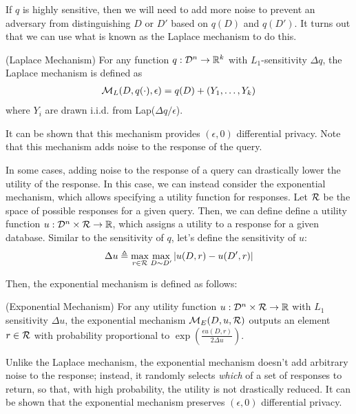 \documentclass{article} %
\begin{document}
If $q$ is highly sensitive, then we will need to add more noise to prevent an
adversary from distinguishing $D$ or $D'$ based on $q(D)$ and $q(D')$. It turns
out that we can use what is known as the Laplace mechanism to do this.

\begin{definition}{(Laplace Mechanism)}
For any function $q : \mathcal{D}^n \rightarrow \mathbb{R}^k$ with $L_1$-sensitivity
$\Delta q$, the Laplace mechanism is defined as
\begin{align*}
\mathcal{M}_L(D, q(\cdot), \epsilon) = q(D) + (Y_1, \dots, Y_k)
\end{align*}
where $Y_i$ are drawn i.i.d. from Lap($\Delta q / \epsilon$).
\label{def:laplace_mechanism}
\end{definition}

It can be shown that this mechanism provides $(\epsilon, 0)$ differential
privacy. Note that this mechanism adds noise to the response of the query.

In some cases, adding noise to the response of a query can drastically lower
the utility of the response. In this case, we can instead consider the
exponential mechanism, which allows specifying a utility function for responses.
Let $\mathcal{R}$ be the space of possible responses for a given query. Then, we can
define define a utility function $u : \mathcal{D}^n \times \mathcal{R} \rightarrow \mathbb{R}$,
which assigns a utility to a response for a given database. Similar to the
sensitivity of $q$, let's define the sensitivity of $u$:
\begin{align*}
\Delta u \triangleq \max_{r \in \mathcal{R}} \max_{D \sim D'} \left\lvert u(D, r) - u(D', r)\right\rvert
\end{align*}

Then, the exponential mechanism is defined as follows:
\begin{definition}{(Exponential Mechanism)}
For any utility function $u : \mathcal{D}^n \times \mathcal{R} \rightarrow \mathbb{R}$ with $L_1$
sensitivity $\Delta u$, the exponential mechanism $\mathcal{M}_E(D, u, \mathcal{R})$ outputs an
element $r \in \mathcal{R}$ with probability proportional to $\exp{(\frac{\epsilon u(D,
r)}{2 \Delta u})}$.
\label{def:exponential_mechanism}
\end{definition}

Unlike the Laplace mechanism, the exponential mechanism doesn't add arbitrary
noise to the response; instead, it randomly selects \textit{which} of a set of
responses to return, so that, with high probability, the utility is not
drastically reduced. It can be shown that the exponential mechanism preserves
$(\epsilon, 0)$ differential privacy.
\end{document}
